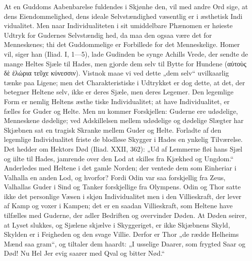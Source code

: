 \documentclass[12pt]{book}
\newcommand{\opage}[1]{\marginnote{\footnotesize\textit{[#1]}}}
\begin{document}
At en Guddoms Aabenbarelse fuldendes i Skjønhe\-%
den, vil med andre Ord sige, at dens Eiendommelighed,
dens ideale Selvstændighed væsentlig er i æsthetisk Indi\-%
vidualitet. Men naar Individualiteten i sit umiddelbare
Phænomen er høieste Udtryk for Gudernes Selvstændig\-%
hed, da maa den ogsaa være det for Menneskenes; thi
det Guddommelige er Forbillede for det Menneskelige.
Homer vil, siger han (Iliad. I, 1---5), lade Gudinden be\-%
synge Achills Vrede, der sendte de mange Heltes Sjæle
til Hades, men gjorde dem selv til Bytte for Hundene
(αὐτοὺς δὲ ἑλώρια τεῦχε κύνεσσιν). Vistnok maae vi
ved dette „dem selv“ uvilkaarlig tænke paa Ligene; men
det Charakteristiske i Udtrykket er dog dette, at det,
der betegner Heltene selv, ikke er deres Sjæle, men deres
Legemer. Den legemlige Form er nemlig Heltens æsthe\-%
tiske Individualitet; at have Individualitet, er fælles for
Guder og Helte. Men nu kommer Forskjellen: Guderne
ere udødelige, Menneskene dødelige; ved Adskillelsen
mellem udødelige og dødelige Slægter har Skjæbnen sat en
tragisk Skranke mellem Guder og Helte. Forladte af
den legemlige Individualitet friste de blodløse Skygger
i Hades en ynkelig Tilværelse. Det hedder om Hektors
Død (Iliad. XXII, 362): „Ud af Lemmerne fløi hans
\opage{23}\setcounter{footnote}{0}%
Sjæl og iilte til Hades, jamrende over den Lod at skilles
fra Kjækhed og Ungdom.“ Anderledes med Heltene i
det gamle Norden; der ventede dem som Einheriar i
Valhalla en anden Lod, og hvorfor? Fordi Odin var
saa forskjellig fra Zeus, Valhallas Guder i Sind og
Tanker forskjellige fra Olympens. Odin og Thor satte
ikke det personlige Væsen i skjøn Individualitet men i
den Villieskraft, der lever af Kamp og voxer i Kampen;
det er en saadan Villieskraft, som Heltene have tilfælles
med Guderne, der adler Bedriften og overvinder Døden.
At Døden seirer, at Lyset slukkes, og Sjælene skjælve i
Skyggeriget, er ikke Skjæbnens Skyld, Skylden er i
Feigheden og den svage Villie. Derfor er Thor „de
rædde Helheims Mænd saa gram“, og tiltaler dem haardt:
„I usselige Daarer, som frygted Saar og Død! Nu Hel
Jer evig saarer med Qval og bitter Nød.“
\end{document}
